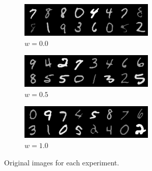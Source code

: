 \documentclass{article}
\begin{document}
	\begin{figure}[H]
		\centering
		\begin{subfigure}{0.3\textwidth}
			\centering
			\includegraphics[width=\textwidth]{images/original_0.0}
			\caption{$w = 0.0$}
			\label{fig:original_0.0}
		\end{subfigure} \hfill
		\begin{subfigure}{0.3\textwidth}
			\centering
			\includegraphics[width=\textwidth]{images/original_0.5}
			\caption{$w = 0.5$}
			\label{fig:original_0.5}
		\end{subfigure} \hfill
		\begin{subfigure}{0.3\textwidth}
			\centering
			\includegraphics[width=\textwidth]{images/original_1.0}
			\caption{$w = 1.0$}
			\label{fig:original_1.0}
		\end{subfigure}
		\caption{Original images for each experiment.}
		\label{fig:original_images}
	\end{figure}
	
\end{document}
